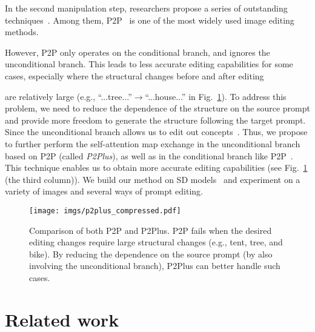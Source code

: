 \documentclass[twocolumn]{svjour3}          \smartqed  \usepackage{graphicx}
\begin{document}
In the second manipulation step, researchers propose a series of outstanding techniques~\citep{Kawar2022ImagicTR,meng2021sdedit,cao2023masactrl,zhang2023adding,couairon2022diffedit,mou2023dragondiffusion,jia2023taming,zhang2023continuous,qiu2023controlling,levin2023differential}. Among them, P2P~\citep{hertz2022prompt} is one of the most widely used image editing methods. 

However, P2P only operates on the conditional branch, and ignores the unconditional branch. This leads to less accurate editing capabilities for some cases, especially where the structural changes before and after editing 

are relatively large (e.g., “...tree...”$\rightarrow$“...house...” in Fig.~\ref{fig:p2plus}).  To address this problem, we need to reduce the dependence of the structure on the source prompt and provide more freedom to generate the structure following the target prompt. Since the unconditional branch allows us to edit out  concepts~\citep{armandpour2023re,Tumanyan_2023_CVPR}. Thus, we propose to further perform the self-attention map exchange in  the unconditional branch based on P2P (called \textit{P2Plus}), as well as in the conditional branch like P2P~\citep{hertz2022prompt}. This technique enables us to obtain more accurate editing capabilities (see Fig.~\ref{fig:p2plus} (the third column)). We build our method on SD models~\citep{rombach2021highresolution} and experiment on a variety of images and several ways of prompt editing.

\begin{figure}[t]
    \centering
    \texttt{[image: imgs/p2plus\_compressed.pdf]}
        \caption{
Comparison of both P2P and P2Plus. P2P fails when the desired editing changes require large structural changes (e.g., tent, tree, and bike). By reducing the dependence on the source prompt (by also involving the unconditional branch), P2Plus can better handle such cases.
        }
    \label{fig:p2plus}
\end{figure}

\section{Related work}
\end{document}
